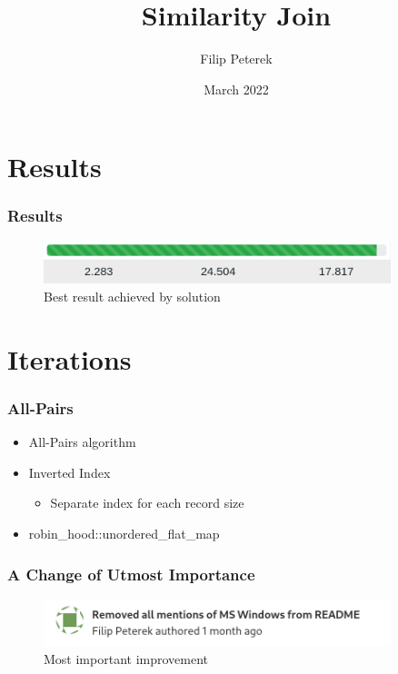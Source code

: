 \documentclass{beamer}
\title{Similarity Join}
\author{Filip Peterek}
\institute{VSB - Technical University of Ostrava}
\date{March 2022}
\begin{document}
    \frame{\titlepage}

    \begin{frame}
        \tableofcontents
    \end{frame}

    \section{Results}

    \begin{frame}
        \frametitle{Results}
        \begin{figure}
            \centering
            \includegraphics[width=0.9\textwidth]{images/pgcontest_time.png}
            \caption{Best result achieved by solution}
        \end{figure}
    \end{frame}

    \section{Iterations}

    \begin{frame}
        \frametitle{All-Pairs}
        \begin{itemize}
            \item All-Pairs algorithm
            \item Inverted Index
                \begin{itemize}
                    \item Separate index for each record size
                \end{itemize}
            \item robin\_hood::unordered\_flat\_map
        \end{itemize}
    \end{frame}

    \begin{frame}
        \frametitle{A Change of Utmost Importance}
        \begin{figure}
            \centering
            \includegraphics[width=0.9\textwidth]{images/win_mentions.png}
            \caption{Most important improvement}
        \end{figure}
    \end{frame}
\end{document}
